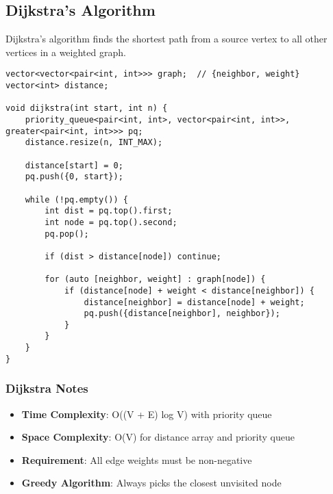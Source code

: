 \documentclass[11pt,a4paper]{article}
\begin{document}
\newpage
\subsection{Dijkstra's Algorithm}
Dijkstra's algorithm finds the shortest path from a source vertex to all other vertices in a weighted graph.

\begin{lstlisting}[caption={Dijkstra's Algorithm}]
vector<vector<pair<int, int>>> graph;  // {neighbor, weight}
vector<int> distance;

void dijkstra(int start, int n) {
    priority_queue<pair<int, int>, vector<pair<int, int>>, greater<pair<int, int>>> pq;
    distance.resize(n, INT_MAX);
    
    distance[start] = 0;
    pq.push({0, start});
    
    while (!pq.empty()) {
        int dist = pq.top().first;
        int node = pq.top().second;
        pq.pop();
        
        if (dist > distance[node]) continue;
        
        for (auto [neighbor, weight] : graph[node]) {
            if (distance[node] + weight < distance[neighbor]) {
                distance[neighbor] = distance[node] + weight;
                pq.push({distance[neighbor], neighbor});
            }
        }
    }
}
\end{lstlisting}

\subsubsection{Dijkstra Notes}
\begin{itemize}
\item \textbf{Time Complexity}: O((V + E) log V) with priority queue
\item \textbf{Space Complexity}: O(V) for distance array and priority queue
\item \textbf{Requirement}: All edge weights must be non-negative
\item \textbf{Greedy Algorithm}: Always picks the closest unvisited node
\end{itemize}
\end{document}
